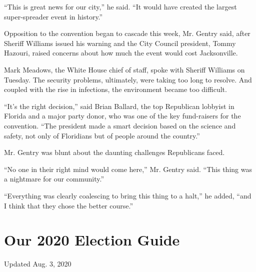 ``This is great news for our city,'' he said. ``It would have created
the largest super-spreader event in history.''

Opposition to the convention began to cascade this week, Mr. Gentry
said, after Sheriff Williams issued his warning and the City Council
president, Tommy Hazouri, raised concerns about how much the event would
cost Jacksonville.

Mark Meadows, the White House chief of staff, spoke with Sheriff
Williams on Tuesday. The security problems, ultimately, were taking too
long to resolve. And coupled with the rise in infections, the
environment became too difficult.

``It's the right decision,'' said Brian Ballard, the top Republican
lobbyist in Florida and a major party donor, who was one of the key
fund-raisers for the convention. ``The president made a smart decision
based on the science and safety, not only of Floridians but of people
around the country.''

Mr. Gentry was blunt about the daunting challenges Republicans faced.

``No one in their right mind would come here,'' Mr. Gentry said. ``This
thing was a nightmare for our community.''

``Everything was clearly coalescing to bring this thing to a halt,'' he
added, ``and I think that they chose the better course.''

\hypertarget{our-2020-election-guide}{%
\section{Our 2020 Election Guide}\label{our-2020-election-guide}}

Updated Aug. 3, 2020

